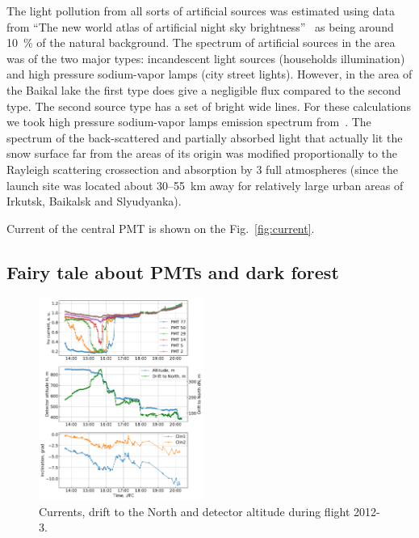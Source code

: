 \documentclass[final,5p,times,twocolumn]{elsarticle}
\begin{document}
The light pollution from all sorts of artificial sources was estimated using data from ``The new world atlas of artificial night sky brightness''~\cite{Falchie1600377} as being around 10~\% of the natural background. The spectrum of artificial sources in the area was of the two major types: incandescent light sources (households illumination) and high pressure sodium-vapor lamps (city street lights). However, in the area of the Baikal lake the first type does give a negligible flux compared to the second type. The second source type has a set of bright wide lines. For these calculations we took high pressure sodium-vapor lamps emission spectrum from~\cite{Elvige2010}. The spectrum of the back-scattered and partially absorbed light that actually lit the snow surface far from the areas of its origin was modified proportionally to the Rayleigh scattering crossection and absorption by 3 full atmospheres (since the launch site was located about 30--55~km away for relatively large urban areas of Irkutsk, Baikalsk and Slyudyanka).

Current of the central PMT is shown on the Fig.~\ref{fig:current}. 



\subsection{Fairy tale about PMTs and dark forest}

\begin{figure}[t]
    \includegraphics[width=0.48\textwidth]{figs/2012-3_currents_H_dN.pdf}
    \caption{Currents, drift to the North and detector altitude during flight 2012-3.}
    \label{fig:2012-3_currents}
\end{figure}
\end{document}
